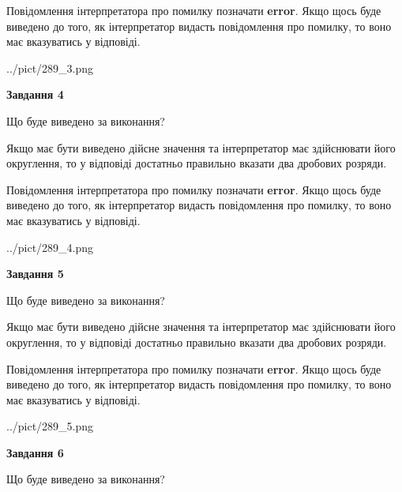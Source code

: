 \documentclass[12pt, ukrainian]{article}
\begin{document}
{\begin {Large}
Повідомлення інтерпретатора про помилку позначати \textbf{error}.
Якщо щось буде виведено до того, як інтерпретатор видасть повідомлення про помилку, 
то воно має вказуватись у відповіді. \par

\begin{center}
	{../pict/289_3.png}
\end{center}
\newpage

{\begin {center}\textbf{Завдання 4}\end {center}}\par
Що буде виведено за виконання? \par

Якщо має бути виведено дійсне значення та інтерпретатор має здійснювати його округлення, 
то у відповіді достатньо правильно вказати два дробових розряди.

Повідомлення інтерпретатора про помилку позначати \textbf{error}.
Якщо щось буде виведено до того, як інтерпретатор видасть повідомлення про помилку, 
то воно має вказуватись у відповіді. \par

\begin{center}
	{../pict/289_4.png}
\end{center}
\newpage

{\begin {center}\textbf{Завдання 5}\end {center}}\par
Що буде виведено за виконання? \par

Якщо має бути виведено дійсне значення та інтерпретатор має здійснювати його округлення, 
то у відповіді достатньо правильно вказати два дробових розряди.

Повідомлення інтерпретатора про помилку позначати \textbf{error}.
Якщо щось буде виведено до того, як інтерпретатор видасть повідомлення про помилку, 
то воно має вказуватись у відповіді. \par

\begin{center}
	{../pict/289_5.png}
\end{center}
\newpage

{\begin {center}\textbf{Завдання 6}\end {center}}\par
Що буде виведено за виконання? \par


\end{Large}}
\end{document}
